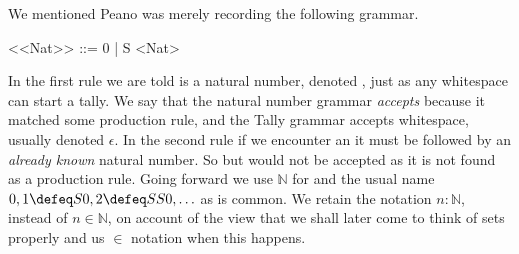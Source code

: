 \index{\code{::=}}
We mentioned Peano was merely recording the following grammar.  
\begin{center}
\begin{minipage}{0.5\textwidth}
\begin{Gcode}[]
<<Nat>> ::= 0 | S <Nat>
\end{Gcode}
\end{minipage}
\end{center}
In the first rule we are told  is a natural number, denoted
, just as any whitespace can start a tally. We say that the natural
number grammar \emph{accepts}  because it matched some production rule,
and the Tally grammar accepts whitespace, usually denoted $\epsilon$.  In the
second rule if we encounter an  it must be followed by an \emph{already
known} natural number.  So  but  would not be accepted as
it is not found as a production rule.  Going forward we use $\mathbb{N}$
for  and the usual name $0,1\defeq S0, 2\defeq SS0,\ldots$ as is common.
We retain the notation $n:\mathbb{N}$, instead of $n\in \mathbb{N}$, on account 
of the view that we shall later come to think of sets properly and us $\in$ notation 
when this happens.  






